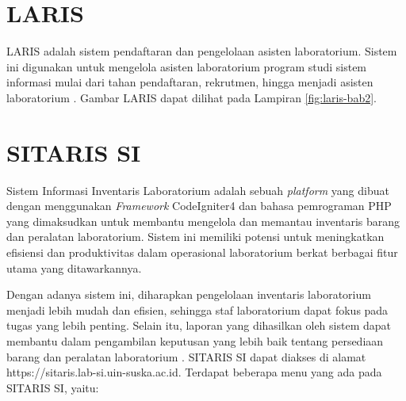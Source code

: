 \section{LARIS}
LARIS adalah sistem pendaftaran dan pengelolaan asisten laboratorium. Sistem ini digunakan untuk mengelola asisten laboratorium program studi sistem informasi mulai dari tahan pendaftaran, rekrutmen, hingga menjadi asisten laboratorium \cite{web-prodi}. Gambar LARIS dapat dilihat pada Lampiran \ref{fig:laris-bab2}.


\section{SITARIS SI}
Sistem Informasi Inventaris Laboratorium adalah sebuah \textit{platform} yang dibuat dengan menggunakan \textit{Framework} CodeIgniter4 dan bahasa pemrograman PHP yang dimaksudkan untuk membantu mengelola dan memantau inventaris barang dan peralatan laboratorium. Sistem ini memiliki potensi untuk meningkatkan efisiensi dan produktivitas dalam operasional laboratorium berkat berbagai fitur utama yang ditawarkannya.

Dengan adanya sistem ini, diharapkan pengelolaan inventaris laboratorium menjadi lebih mudah dan efisien, sehingga staf laboratorium dapat fokus pada tugas yang lebih penting. Selain itu, laporan yang dihasilkan oleh sistem dapat membantu dalam pengambilan keputusan yang lebih baik tentang persediaan barang dan peralatan laboratorium \cite{sitaris}. SITARIS SI dapat diakses di alamat https://sitaris.lab-si.uin-suska.ac.id. Terdapat beberapa menu yang ada pada SITARIS SI, yaitu:

